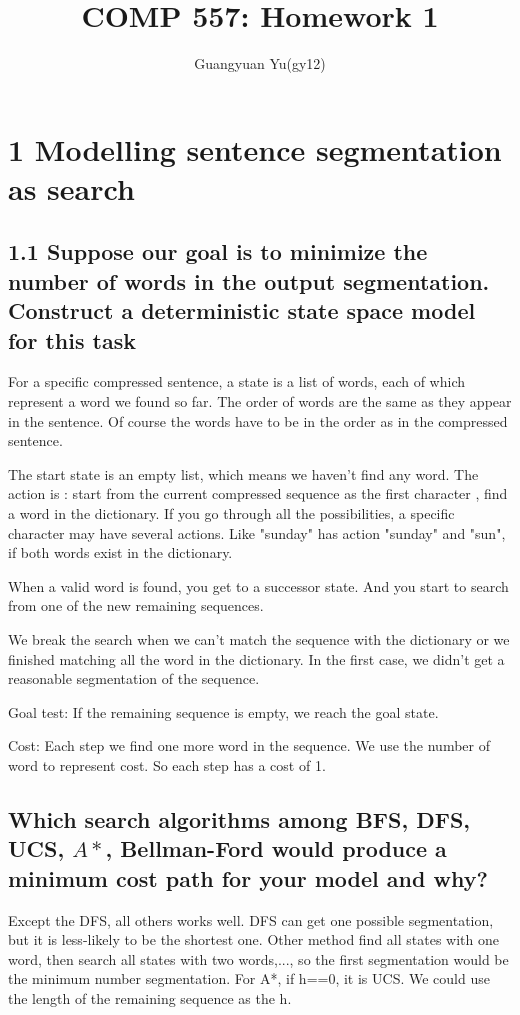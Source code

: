 \documentclass[12pt]{article}
\title{COMP 557: Homework 1}
\author{Guangyuan Yu(gy12)}
\begin{document}
\maketitle


\section{1 Modelling sentence segmentation as search}
\subsection{1.1 Suppose our goal is to minimize the number of words in the output segmentation. Construct a deterministic state space model for this task}

For a specific compressed sentence, a state is a list of words, each of which represent a word we found so far. The order of words are the same as they appear in the sentence. Of course the words have to be in the order as in the compressed sentence.

The start state is an empty list, which means we haven't find any word. 
The action is : start from the current compressed sequence as the first character , find a word in the dictionary. If you go through all the possibilities, a specific character may have several actions. Like "sunday" has action "sunday" and "sun", if both words exist in the dictionary. 

When a valid word is found, you get to a successor state. And you start to search from one of the new remaining sequences. 

We break the search when we can't match the sequence with the dictionary or we finished matching all the word in the dictionary. In the first case, we didn't get a reasonable segmentation of the sequence. 

Goal test: If the remaining sequence is empty, we reach the goal state. 

Cost: Each step we find one more word in the sequence. We
use the number of word to represent cost. So each step has a cost of 1.

\subsection{Which search algorithms among BFS, DFS, UCS, $A*$, Bellman-Ford would produce a minimum cost path for your model and why?}
Except the DFS, all others works well. DFS can get one possible segmentation, but it is less-likely to be the shortest one. Other method find all states with one word, then search all states with two words,..., so the first segmentation would be the minimum number segmentation. For A*, if h==0, it is UCS. We could use the length of the remaining sequence as the h.
\end{document}
